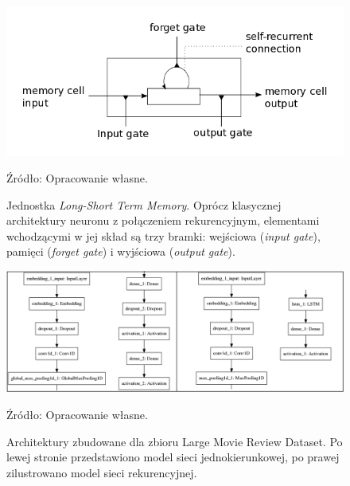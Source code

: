 \documentclass[12pt,a4paper,twoside]{article}
\newcommand{\source}[1]{\caption*{\hfill Źródło: {#1}} }
\begin{document}
\begin{figure}[h]
  \centering
\includegraphics[scale=0.4]{../obrazy/fig:lstm_memcell.png}
\caption{Jednostka \textit{Long-Short Term Memory}. Oprócz klasycznej architektury neuronu z połączeniem rekurencyjnym, elementami wchodzącymi w jej skład są trzy bramki: wejściowa (\textit{input gate}), pamięci (\textit{forget gate}) i wyjściowa (\textit{output gate}).\label{fig:lstm_memcell}}
\source{Opracowanie własne.}
\end{figure}
\begin{figure}[h]
  \centering
\includegraphics[scale=0.35]{../obrazy/fig:imdb_cnn.png}
\caption{Architektury zbudowane dla zbioru Large Movie Review Dataset. Po lewej stronie przedstawiono model sieci jednokierunkowej, po prawej zilustrowano model sieci rekurencyjnej.\label{fig:imdb_cnn}}
\source{Opracowanie własne.}
\end{figure}
\end{document}
